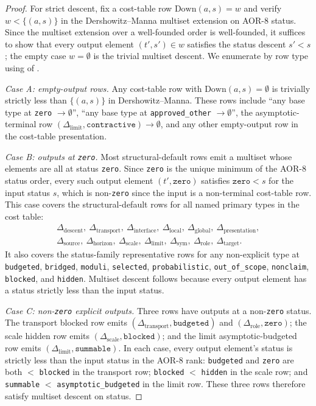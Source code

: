 \documentclass[11pt]{article}
\newcommand{\Ddescent}{\Delta_{\mathrm{descent}}}
\newcommand{\Dtransport}{\Delta_{\mathrm{transport}}}
\newcommand{\Dinterface}{\Delta_{\mathrm{interface}}}
\newcommand{\Dlocal}{\Delta_{\mathrm{local}}}
\newcommand{\Dglobal}{\Delta_{\mathrm{global}}}
\newcommand{\Dpresentation}{\Delta_{\mathrm{presentation}}}
\newcommand{\Dsource}{\Delta_{\mathrm{source}}}
\newcommand{\Dhorizon}{\Delta_{\mathrm{horizon}}}
\newcommand{\Dscale}{\Delta_{\mathrm{scale}}}
\newcommand{\Dlimit}{\Delta_{\mathrm{limit}}}
\newcommand{\Dsym}{\Delta_{\mathrm{sym}}}
\newcommand{\Drole}{\Delta_{\mathrm{role}}}
\newcommand{\Dtarget}{\Delta_{\mathrm{target}}}
\theoremstyle{definition}
\begin{document}
\begin{proof}
For strict descent, fix a cost-table row \(\mathrm{Down}(a,s)=w\) and verify
\(w<\{(a,s)\}\) in the Dershowitz--Manna multiset extension on AOR-8 status.
Since the multiset extension over a well-founded order is well-founded, it
suffices to show that every output element \((t',s')\in w\) satisfies the
status descent \(s'<s\); the empty case \(w=\emptyset\) is the trivial
multiset descent.  We enumerate by row type using
 of
.

\emph{Case A: empty-output rows.}  Any cost-table row with
\(\mathrm{Down}(a,s)=\emptyset\) is trivially strictly less than
\(\{(a,s)\}\) in Dershowitz--Manna.  These rows include ``any base type at
\texttt{zero} \(\to\emptyset\)'', ``any base type at
\texttt{approved\_other} \(\to\emptyset\)'', the asymptotic-terminal row
\((\Dlimit,\texttt{contractive})\to\emptyset\), and any other empty-output
row in the cost-table presentation.

\emph{Case B: outputs at \texttt{zero}.}  Most structural-default rows emit a
multiset whose elements are all at status \texttt{zero}.  Since
\texttt{zero} is the unique minimum of the AOR-8 status order, every such
output element \((t',\texttt{zero})\) satisfies \(\texttt{zero}<s\) for the
input status \(s\), which is non-\texttt{zero} since the input is a
non-terminal cost-table row.  This case covers the structural-default rows
for all named primary types in the cost table:
\[
\begin{gathered}
\Ddescent,\ \Dtransport,\ \Dinterface,\ \Dlocal,\ \Dglobal,\ \Dpresentation,\\
\Dsource,\ \Dhorizon,\ \Dscale,\ \Dlimit,\ \Dsym,\ \Drole,\ \Dtarget.
\end{gathered}
\]
It also covers the status-family representative rows for any non-explicit
type at \texttt{budgeted}, \texttt{bridged}, \texttt{moduli},
\texttt{selected}, \texttt{probabilistic}, \texttt{out\_of\_scope},
\texttt{nonclaim}, \texttt{blocked}, and \texttt{hidden}.  Multiset descent
follows because every output element has a status strictly less than the
input status.

\emph{Case C: non-\texttt{zero} explicit outputs.}  Three rows have outputs
at a non-\texttt{zero} status.  The transport blocked row emits
\((\Dtransport,\texttt{budgeted})\) and \((\Drole,\texttt{zero})\); the scale
hidden row emits \((\Dscale,\texttt{blocked})\); and the limit
asymptotic-budgeted row emits \((\Dlimit,\texttt{summable})\).  In each case,
every output element's status is strictly less than the input status in the
AOR-8 rank: \texttt{budgeted} and \texttt{zero} are both \(<\)
\texttt{blocked} in the transport row; \texttt{blocked} \(<\) \texttt{hidden}
in the scale row; and \texttt{summable} \(<\)
\texttt{asymptotic\_budgeted} in the limit row.  These three rows therefore
satisfy multiset descent on status.


\end{proof}
\end{document}
